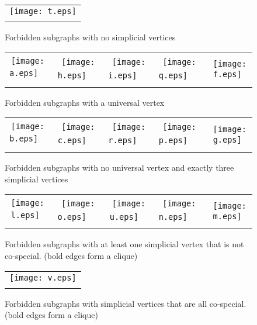 \documentclass[11pt]{article}
\begin{document}
    \begin{figure}[e]
      \centering
\begin{tabular}{c}
\texttt{[image: t.eps]} \\
 \\
\end{tabular}
\caption{Forbidden subgraphs with no simplicial vertices}
\label{fig:nosimpl}
    \end{figure}


    \begin{figure}[e]
      \centering
\begin{tabular}{ccccc}
\texttt{[image: a.eps]} \ &\
\texttt{[image: h.eps]} \ &\
\texttt{[image: i.eps]} \ &\
\texttt{[image: q.eps]} \ &\
\texttt{[image: f.eps]} \\
 &  &  &  & 
\end{tabular}
      \caption{Forbidden subgraphs with a universal vertex}
\label{fig:univ}
    \end{figure}

    \begin{figure}[e]
      \centering
\begin{tabular}{ccccc}
\texttt{[image: b.eps]} \ &\
\texttt{[image: c.eps]} \ &\
\texttt{[image: r.eps]} \ &\
\texttt{[image: p.eps]}  \ &\
\texttt{[image: g.eps]} \\
 &  &  &  &  \\
\end{tabular}
      \caption{Forbidden subgraphs with no universal vertex and exactly
      three simplicial vertices}
\label{fig:3simpl}
    \end{figure}

    \begin{figure}[e]
      \centering
\begin{tabular}{ccccc}
\texttt{[image: l.eps]}\ &\
\texttt{[image: o.eps]} \ &\
\texttt{[image: u.eps]}\ &\
\texttt{[image: n.eps]}  \ &\
\texttt{[image: m.eps]} \\
 &  &
 &  &  \\
\end{tabular}
\caption{Forbidden subgraphs with at least one simplicial vertex that
    is not co-special. (bold edges form a clique)}
\label{fig:4simpl}
    \end{figure}


    \begin{figure}[e]
      \centering
\begin{tabular}{c}
\texttt{[image: v.eps]} \\
 \\
\end{tabular}
\caption{Forbidden subgraphs with  simplicial vertices that
    are all co-special. (bold edges form a clique)}
\label{fig:4cospe}
    \end{figure}
\end{document}
